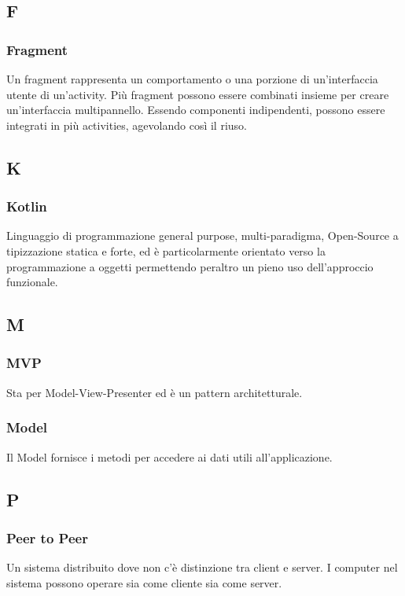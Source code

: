 \subsection*{F}
\subsubsection*{Fragment}
Un fragment rappresenta un comportamento o una porzione di un'interfaccia utente di un'activity. Più fragment possono essere combinati insieme per creare un'interfaccia multipannello. Essendo componenti indipendenti, possono essere integrati in più activities, agevolando così il riuso.

\subsection*{K}
\subsubsection*{Kotlin}
Linguaggio di programmazione general purpose, multi-paradigma, Open-Source a tipizzazione statica e forte, ed è particolarmente orientato verso la programmazione a oggetti permettendo peraltro un pieno uso dell'approccio funzionale.

\subsection*{M}
\subsubsection*{MVP}
Sta per Model-View-Presenter ed è un pattern architetturale.
\subsubsection*{Model}
Il Model fornisce i metodi per accedere ai dati utili all'applicazione.

\subsection*{P}
\subsubsection*{Peer to Peer}
Un sistema distribuito dove non c'è distinzione tra client e server. I computer nel sistema possono operare sia come cliente sia come server. 
